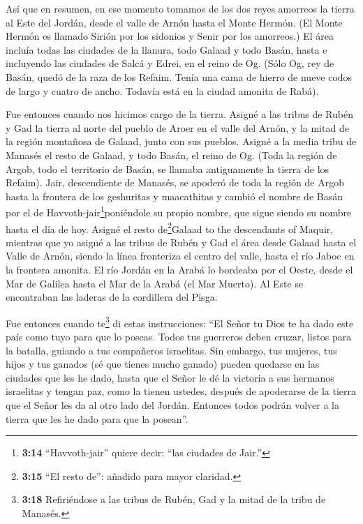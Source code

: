 Así que en resumen, en ese momento tomamos de los dos reyes
amorreos la tierra al Este del Jordán, desde el valle de Arnón hasta el
Monte Hermón.  (El Monte Hermón es llamado Sirión por los
sidonios y Senir por los amorreos.)  El área incluía todas
las ciudades de la llanura, todo Galaad y todo Basán, hasta e incluyendo
las ciudades de Salcá y Edrei, en el reino de Og.  (Sólo
Og, rey de Basán, quedó de la raza de los Refaim. Tenía una cama de
hierro de nueve codos de largo y cuatro de ancho. Todavía está en la
ciudad amonita de Rabá).

 Fue entonces cuando nos hicimos cargo de la tierra. Asigné
a las tribus de Rubén y Gad la tierra al norte del pueblo de Aroer en el
valle del Arnón, y la mitad de la región montañosa de Galaad, junto con
sus pueblos.  Asigné a la media tribu de Manasés el resto
de Galaad, y todo Basán, el reino de Og. (Toda la región de Argob, todo
el territorio de Basán, se llamaba antiguamente la tierra de los
Refaim).  Jair, descendiente de Manasés, se apoderó de toda
la región de Argob hasta la frontera de los geshuritas y maacathitas y
cambió el nombre de Basán por el de Havvoth-jair\footnote{\textbf{3:14}
  ``Havvoth-jair'' quiere decir: ``las ciudades de Jair.''}poniéndole su
propio nombre, que sigue siendo su nombre hasta el día de hoy.
 Asigné el resto de\footnote{\textbf{3:15} ``El resto de'':
  añadido para mayor claridad.}Galaad to the descendants of Maquir,
 mientras que yo asigné a las tribus de Rubén y Gad el área
desde Galaad hasta el Valle de Arnón, siendo la línea fronteriza el
centro del valle, hasta el río Jaboc en la frontera amonita.
 El río Jordán en la Arabá lo bordeaba por el Oeste, desde
el Mar de Galilea hasta el Mar de la Arabá (el Mar Muerto). Al Este se
encontraban las laderas de la cordillera del Pisga.

 Fue entonces cuando te\footnote{\textbf{3:18} Refiriéndose
  a las tribus de Rubén, Gad y la mitad de la tribu de Manasés.} di
estas instrucciones: ``El Señor tu Dios te ha dado este país como tuyo
para que lo poseas. Todos tus guerreros deben cruzar, listos para la
batalla, guiando a tus compañeros israelitas.  Sin embargo,
tus mujeres, tus hijos y tus ganados (sé que tienes mucho ganado) pueden
quedarse en las ciudades que les he dado,  hasta que el
Señor le dé la victoria a sus hermanos israelitas y tengan paz, como la
tienen ustedes, después de apoderarse de la tierra que el Señor les da
al otro lado del Jordán. Entonces todos podrán volver a la tierra que
les he dado para que la posean''.

